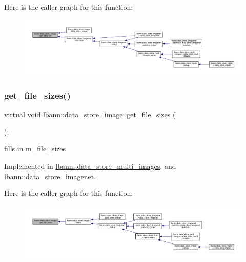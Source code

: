 Here is the caller graph for this function\+:\nopagebreak
\begin{figure}[H]
\begin{center}
\leavevmode
\includegraphics[width=350pt]{classlbann_1_1data__store__image_aa9e47fb3cad58dda4eaddcccc9bfa523_icgraph}
\end{center}
\end{figure}
\mbox{\label{classlbann_1_1data__store__image_a8694bc9157c5fdc80bb5c251e68e18cb}} 
\subsubsection{\texorpdfstring{get\+\_\+file\+\_\+sizes()}{get\_file\_sizes()}}
{\footnotesize\ttfamily virtual void lbann\+::data\+\_\+store\+\_\+image\+::get\+\_\+file\+\_\+sizes (\begin{DoxyParamCaption}{ }\end{DoxyParamCaption})\hspace{0.3cm}{\ttfamily [protected]}, {}}



fills in m\+\_\+file\+\_\+sizes 



Implemented in \hyperlink{classlbann_1_1data__store__multi__images_a25963dfa7d6de983e7b250f8ef7e2a0e}{lbann\+::data\+\_\+store\+\_\+multi\+\_\+images}, and \hyperlink{classlbann_1_1data__store__imagenet_ae8f5d8741ddd762ffd3a477504bca619}{lbann\+::data\+\_\+store\+\_\+imagenet}.

Here is the caller graph for this function\+:\nopagebreak
\begin{figure}[H]
\begin{center}
\leavevmode
\includegraphics[width=350pt]{classlbann_1_1data__store__image_a8694bc9157c5fdc80bb5c251e68e18cb_icgraph}
\end{center}
\end{figure}
\mbox{\label{classlbann_1_1data__store__image_a8a53bab58d75554821f90c38d14078aa}} 
